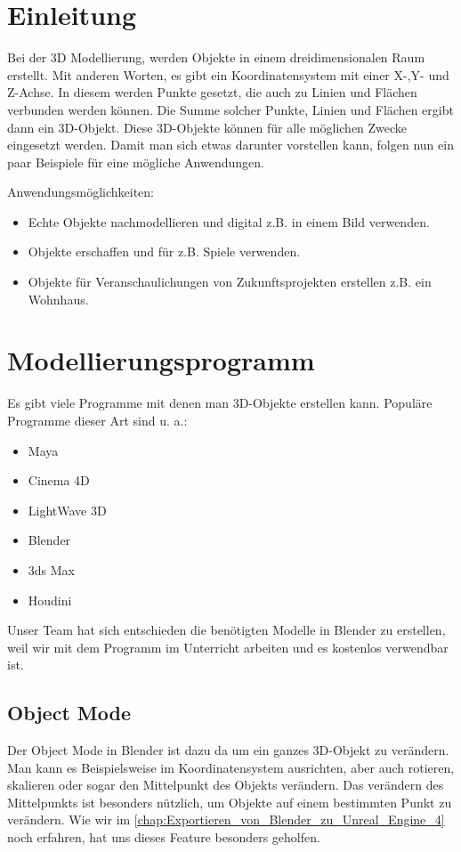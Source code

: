 \section{Einleitung}
Bei der 3D Modellierung, werden Objekte in einem dreidimensionalen Raum erstellt. Mit anderen Worten, es gibt ein Koordinatensystem mit einer X-,Y- und Z-Achse.
In diesem werden Punkte gesetzt, die auch zu Linien und Flächen verbunden werden können. Die Summe solcher Punkte, Linien und Flächen ergibt dann ein 3D-Objekt.
Diese 3D-Objekte können für alle möglichen Zwecke eingesetzt werden. Damit man sich etwas darunter vorstellen kann, folgen nun ein paar Beispiele für
eine mögliche Anwendungen.

Anwendungsmöglichkeiten:
\begin{itemize}
    \item Echte Objekte nachmodellieren und digital z.B. in einem Bild verwenden.
    \item Objekte erschaffen und für z.B. Spiele verwenden.
    \item Objekte für Veranschaulichungen von Zukunftsprojekten erstellen z.B. ein Wohnhaus.
\end{itemize}

\section{Modellierungsprogramm}
Es gibt viele Programme mit denen man 3D-Objekte erstellen kann.
\citep{wiki:modellierungsprogramm_beispiele}  Populäre Programme dieser Art sind u. a.:

\begin{itemize}
    \item Maya
    \item Cinema 4D
    \item LightWave 3D
    \item Blender
    \item 3ds Max
    \item Houdini
\end{itemize}

Unser Team hat sich entschieden die benötigten Modelle in Blender zu erstellen, weil wir mit dem Programm im Unterricht arbeiten und
es kostenlos verwendbar ist.


\subsection{Object Mode}
Der Object Mode in Blender ist dazu da um ein ganzes 3D-Objekt zu verändern. Man kann es Beispielsweise im Koordinatensystem ausrichten, aber
auch rotieren, skalieren oder sogar den Mittelpunkt des Objekts verändern. Das verändern des Mittelpunkts ist besonders nützlich, um Objekte auf
einem bestimmten Punkt zu verändern. Wie wir im \autoref{chap:Exportieren_von_Blender_zu_Unreal_Engine_4} noch erfahren, hat uns dieses Feature besonders geholfen.

